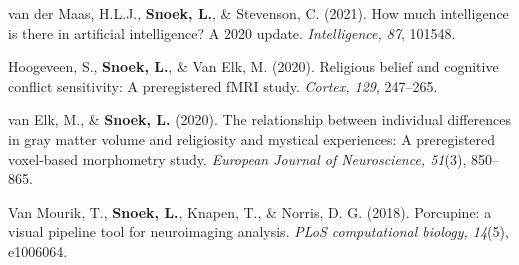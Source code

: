 \documentclass[11pt,american,a4paper,oneside,]{memoir} %
\begin{document}
van der Maas, H.L.J., \textbf{Snoek, L.}, \& Stevenson, C. (2021). How much intelligence is there in artificial intelligence? A 2020 update. \emph{Intelligence, 87}, 101548.

Hoogeveen, S., \textbf{Snoek, L.}, \& Van Elk, M. (2020). Religious belief and cognitive conflict sensitivity: A preregistered fMRI study. \emph{Cortex, 129}, 247--265.

van Elk, M., \& \textbf{Snoek, L.} (2020). The relationship between individual differences in gray matter volume and religiosity and mystical experiences: A preregistered voxel‐based morphometry study. \emph{European Journal of Neuroscience, 51}(3), 850--865.

Van Mourik, T., \textbf{Snoek, L.}, Knapen, T., \& Norris, D. G. (2018). Porcupine: a visual pipeline tool for neuroimaging analysis. \emph{PLoS computational biology, 14}(5), e1006064.

\normalsize
\setlength{\parindent}{1.5em}

\backmatter
\end{document}
